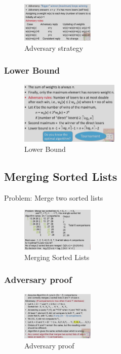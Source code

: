 \begin{figure}[H]
    \centering
    \includegraphics[width=0.309\textwidth]{pic/DAA2/Adversary}
    \caption{Adversary strategy}
\end{figure}

\subsubsection{Lower Bound}
\begin{figure}[H]
    \centering
    \includegraphics[width=0.42\textwidth]{pic/DAA2/Lower Bound}
    \caption{Lower Bound}
\end{figure}

\subsection{Merging Sorted Lists}
Problem: Merge two sorted lists 

\begin{figure}[H]
    \centering
    \includegraphics[width=0.309\textwidth]{pic/DAA3/Merging Sorted Lists}
    \caption{Merging Sorted Lists}
\end{figure}

\subsubsection{Adversary proof}
\begin{figure}[H]
    \centering
    \includegraphics[width=0.309\textwidth]{pic/DAA3/Adversary proof}
    \caption{Adversary proof}
\end{figure}